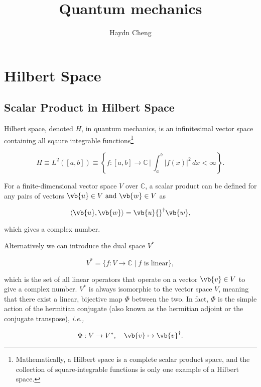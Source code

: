 \documentclass[a4paper,12pt]{report}
\title{Quantum mechanics}
\author{Haydn Cheng}
\date{}
\begin{document}
\maketitle
\tableofcontents

\chapter{Hilbert Space}

\section{Scalar Product in Hilbert Space}

Hilbert space, denoted \(H\), in quantum mechanics, is an infinitesimal vector space containing all sqaure integrable functions\footnote{Mathematically, a Hilbert space is a complete scalar product space, and the collection of square-integrable functions is only one example of a Hilbert space.}

\begin{equation}
  H \equiv L^2([a,b]) \equiv \left\{ f:[a,b]\to\mathbb{C} \,\bigg|\, \int_{a}^{b} |f(x)|^2 \, dx < \infty \right\}.
\end{equation}

For a finite-dimensional vector space \(V\) over \(\mathbb{C}\), a scalar product can be defined for any pairs of vectors \(\vb{u} \in V \text { and } \vb{w} \in V\) as 

\begin{equation}
  \left \langle {\vb{u} ,\vb{w} } \right \rangle = \vb{u} {}^{\dagger}  \vb{w} ,
\end{equation}

which gives a complex number. 

Alternatively we can introduce the dual space \(V^*\)

\begin{equation}
  V^* = \{ f: V \to \mathbb{C} \mid f \text{ is linear} \},
\end{equation}

which is the set of all linear operators that operate on a vector \(\vb{v} \in  V\) to give a complex number. \(V^*\) is always isomorphic to the vector space \(V\), meaning that there exist a linear, bijective map \(\Phi \) between the two. In fact, \(\Phi \) is the simple action of the hermitian conjugate (also known as the hermitian adjoint or the conjugate transpose), \textit{i.e.,}

\begin{equation}
  \Phi: V \to V^*, \quad \vb{v}  \mapsto \vb{v} ^\dagger.
\end{equation}
\end{document}
